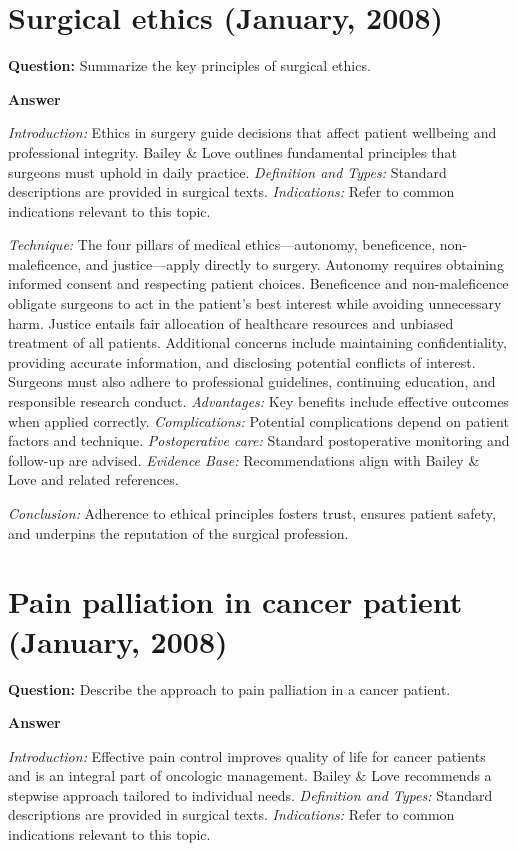 \documentclass{article}
\begin{document}
\section{Surgical ethics (January, 2008)}

\textbf{Question:} Summarize the key principles of surgical ethics.

\textbf{Answer}

\emph{Introduction:} Ethics in surgery guide decisions that affect patient wellbeing and professional integrity. Bailey \& Love outlines fundamental principles that surgeons must uphold in daily practice.
\emph{Definition and Types:} Standard descriptions are provided in surgical texts.
\emph{Indications:} Refer to common indications relevant to this topic.

\emph{Technique:} The four pillars of medical ethics—autonomy, beneficence, non-maleficence, and justice—apply directly to surgery. Autonomy requires obtaining informed consent and respecting patient choices. Beneficence and non-maleficence obligate surgeons to act in the patient's best interest while avoiding unnecessary harm. Justice entails fair allocation of healthcare resources and unbiased treatment of all patients. Additional concerns include maintaining confidentiality, providing accurate information, and disclosing potential conflicts of interest. Surgeons must also adhere to professional guidelines, continuing education, and responsible research conduct.
\emph{Advantages:} Key benefits include effective outcomes when applied correctly.
\emph{Complications:} Potential complications depend on patient factors and technique.
\emph{Postoperative care:} Standard postoperative monitoring and follow-up are advised.
\emph{Evidence Base:} Recommendations align with Bailey \& Love and related references.

\emph{Conclusion:} Adherence to ethical principles fosters trust, ensures patient safety, and underpins the reputation of the surgical profession.


\section{Pain palliation in cancer patient (January, 2008)}

\textbf{Question:} Describe the approach to pain palliation in a cancer patient.

\textbf{Answer}

\emph{Introduction:} Effective pain control improves quality of life for cancer patients and is an integral part of oncologic management. Bailey \& Love recommends a stepwise approach tailored to individual needs.
\emph{Definition and Types:} Standard descriptions are provided in surgical texts.
\emph{Indications:} Refer to common indications relevant to this topic.
\end{document}
